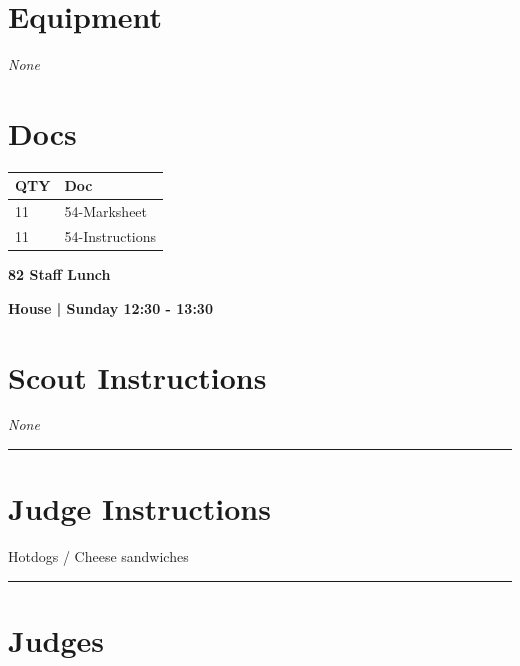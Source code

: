 \documentclass[10pt]{article}
\newcommand{\newtitle}[1]{\begin{center}{\Huge\bfseries #1 }\\ \vspace{5mm}\end{center}}
\newcommand{\newsubtitle}[1]{\begin{center}{\color{grey}\Large\bfseries #1 }\\ \vspace{5mm}\end{center}}
\begin{document}
	\begin{multicols}{2}

		\section*{\faWrench \: Equipment}

				\textit{None}
		
		\vfill\null
		\columnbreak

			\section*{\faFile \: Docs}
		 	\begin{center}
			\begin{tabular}{p{2cm}p{4cm}}

			\textbf{QTY} & \textbf{Doc} \\\toprule
										11&54-Marksheet\\\midrule
										11&54-Instructions\\\midrule
							\end{tabular}
			\end{center}
	

		\vfill\null

		\end{multicols}



	\vspace{1cm}


	\clearpage
		\newtitle{82 Staff Lunch }
	\newsubtitle{House | Sunday 12:30 - 13:30}
		\setcounter{section}{81}
	\section*{Scout Instructions}
		\textit{None}
	
	\vspace{0.5cm}
	\hrule
	\vspace{0.5cm}

		\section*{Judge Instructions}
		Hotdogs / Cheese sandwiches
\vspace{0.5cm}
	\hrule
	\vspace{0.5cm}
		\section*{\faUsers \: Judges}
\end{document}

